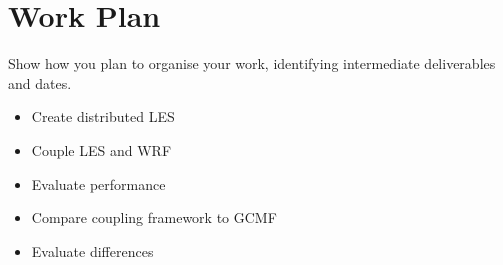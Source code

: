 \documentclass{acm_proc_article-sp}
\begin{document}
\section*{Work Plan}

Show how you plan to organise your work, identifying intermediate deliverables
and dates.

\begin{itemize}
	\item Create distributed LES
	\item Couple LES and WRF
	\item Evaluate performance
	\item Compare coupling framework to GCMF
	\item Evaluate differences
\end{itemize}



\end{document}
